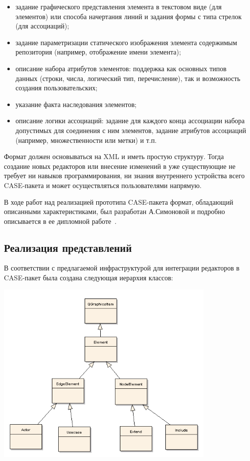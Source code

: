 \documentclass[a5paper]{article}
\begin{document}
\begin{itemize}
  \item задание графического представления элемента в текстовом виде (для
        элементов) или способа начертания линий и задания формы с типа стрелок
        (для ассоциаций);
  \item задание параметризации статического изображения элемента содержимым
        репозитория (например, отображение имени элемента);
  \item описание набора атрибутов элементов: поддержка как основных типов данных
        (строки, числа, логический тип, перечисление), так и возможность
        создания пользовательских;
  \item указание факта наследования элементов;
  \item описание логики ассоциаций: задание для каждого конца ассоциации набора
        допустимых для соединения с ним элементов, задание атрибутов ассоциаций
        (например, множественности или метки) и т.п.
\end{itemize}

Формат должен основываться на XML и иметь
простую структуру. Тогда создание новых редакторов или внесение
изменений в уже существующие не требует ни навыков программирования, ни
знания внутреннего устройства всего CASE-пакета и может осуществляться
пользователями напрямую.

В ходе работ над реализацией прототипа CASE-пакета формат, обладающий описанными
характеристиками, был разработан А.Симоновой и подробно описывается в
ее дипломной работе~\cite{simonova}.

\subsection{Реализация представлений}

В соответствии с предлагаемой инфраструктурой для интеграции редакторов
в CASE-пакет была создана следующая иерархия классов:

{
\includegraphics[width=10.786cm,height=9.038cm]{draft04-img2.png} \par}
\end{document}
